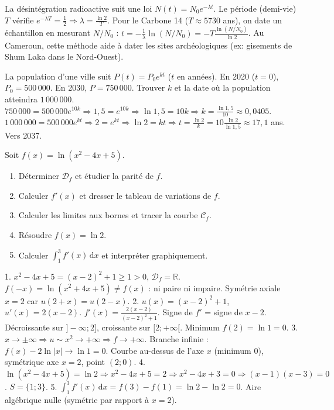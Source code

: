 \documentclass[11pt]{article}
\newcommand{\cle}[1]{{\popxbold\color{popdark}#1}}
\begin{document}
\begin{savaistu}
La désintégration radioactive suit une loi $N(t) = N_0 e^{-\lambda t}$.
Le \cle{période} (demi-vie) $T$ vérifie $e^{-\lambda T} = \frac{1}{2} \Rightarrow \lambda = \frac{\ln 2}{T}$.
Pour le Carbone 14 ($T \approx 5730$ ans), on date un échantillon en mesurant $N/N_0$ :
$t = -\frac{1}{\lambda}\ln(N/N_0) = -T \frac{\ln(N/N_0)}{\ln 2}$.
Au Cameroun, cette méthode aide à dater les sites archéologiques (ex: gisements de Shum Laka dans le Nord-Ouest).
\end{savaistu}

\begin{exemplebox}
La population d'une ville suit $P(t) = P_0 e^{kt}$ ($t$ en années).
En 2020 ($t=0$), $P_0 = 500\,000$. En 2030, $P = 750\,000$.
Trouver $k$ et la date où la population atteindra $1\,000\,000$.
\tcblower
$750\,000 = 500\,000 e^{10k} \Rightarrow 1,5 = e^{10k} \Rightarrow \ln 1,5 = 10k \Rightarrow k = \frac{\ln 1,5}{10} \approx 0,0405$.
$1\,000\,000 = 500\,000 e^{kt} \Rightarrow 2 = e^{kt} \Rightarrow \ln 2 = kt \Rightarrow t = \frac{\ln 2}{k} = 10 \frac{\ln 2}{\ln 1,5} \approx 17,1$ ans.
Vers 2037.
\end{exemplebox}

\begin{exercice}
Soit $f(x) = \ln(x^2 - 4x + 5)$.
\begin{enumerate}
  \item Déterminer $\mathcal{D}_f$ et étudier la parité de $f$.
  \item Calculer $f'(x)$ et dresser le tableau de variations de $f$.
  \item Calculer les limites aux bornes et tracer la courbe $\mathcal{C}_f$.
  \item Résoudre $f(x) = \ln 2$.
  \item Calculer $\int_1^3 f'(x)\,\mathrm{d}x$ et interpréter graphiquement.
\end{enumerate}
\end{exercice}

\begin{corrige}
1. $x^2-4x+5 = (x-2)^2+1 \ge 1 > 0$, $\mathcal{D}_f = \mathbb{R}$. $f(-x) = \ln(x^2+4x+5) \neq f(x)$ : ni paire ni impaire. Symétrie axiale $x=2$ car $u(2+x)=u(2-x)$.
2. $u(x) = (x-2)^2+1$, $u'(x) = 2(x-2)$. $f'(x) = \frac{2(x-2)}{(x-2)^2+1}$. Signe de $f'$ = signe de $x-2$.
Décroissante sur $]-\infty;2]$, croissante sur $[2;+\infty[$. Minimum $f(2) = \ln 1 = 0$.
3. $x\to\pm\infty \Rightarrow u\sim x^2 \to +\infty \Rightarrow f\to +\infty$. Branche infinie : $f(x) - 2\ln|x| \to \ln 1 = 0$. Courbe au-dessus de l'axe $x$ (minimum 0), symétrique axe $x=2$, point $(2;0)$.
4. $\ln(x^2-4x+5) = \ln 2 \Rightarrow x^2-4x+5 = 2 \Rightarrow x^2-4x+3=0 \Rightarrow (x-1)(x-3)=0$. $S=\{1;3\}$.
5. $\int_1^3 f'(x)\,\mathrm{d}x = f(3)-f(1) = \ln 2 - \ln 2 = 0$. Aire algébrique nulle (symétrie par rapport à $x=2$).
\end{corrige}
\end{document}
